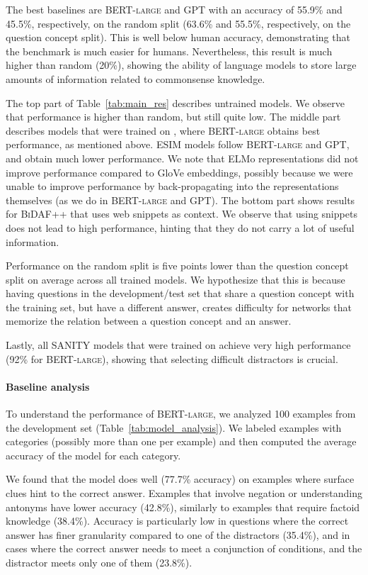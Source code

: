 The best baselines are \textsc{BERT-large} and \textsc{GPT} with an accuracy of 55.9\% and 45.5\%, respectively, on the random split (63.6\% and 55.5\%, respectively, on the question concept split). This is well below human accuracy, demonstrating that the benchmark is much easier for humans. Nevertheless, this result is much higher than random (20\%), showing the ability of language models to store large amounts of information related to commonsense knowledge.

The top part of Table~\ref{tab:main_res} describes untrained models. We observe that performance is higher than random, but still quite low. The middle part describes models that were trained on \csqa{}, where \textsc{BERT-large} obtains best performance, as mentioned above. 
\textsc{ESIM} models follow \textsc{BERT-large} and \textsc{GPT}, and obtain much lower performance. We note that ELMo representations did not improve performance compared to GloVe embeddings, possibly because we were unable to improve performance by back-propagating into the representations themselves (as we do in \textsc{BERT-large} and \textsc{GPT}). 
The bottom part shows results for \textsc{BiDAF++} that uses web snippets as context. We observe that using snippets does not lead to high performance, hinting that they do not carry a lot of useful information.

Performance on the random split is five points lower than the question concept split on average across all trained models. We hypothesize that this is because having questions in the development/test set that share a question concept with the training set, but have a different answer, creates difficulty for networks that memorize the relation between a question concept and an answer.

Lastly, all SANITY models that were trained on \csqa{} achieve very high performance (92\% for \textsc{BERT-large}), showing that selecting difficult distractors is crucial.

\paragraph{Baseline analysis}

To understand the performance of \textsc{BERT-large}, we analyzed 100 examples from the development set (Table~\ref{tab:model_analysis}). We labeled examples with categories (possibly more than one per example) and then computed the average accuracy of the model for each category.

We found that the model does well (77.7\% accuracy) on examples where surface clues hint to the correct answer. Examples that involve negation or understanding antonyms have lower accuracy (42.8\%), similarly to examples that require factoid knowledge (38.4\%). Accuracy is particularly low in questions where the correct answer has finer granularity compared to one of the distractors (35.4\%), and in cases where the correct answer needs to meet a conjunction of conditions, and the distractor meets only one of them (23.8\%).

